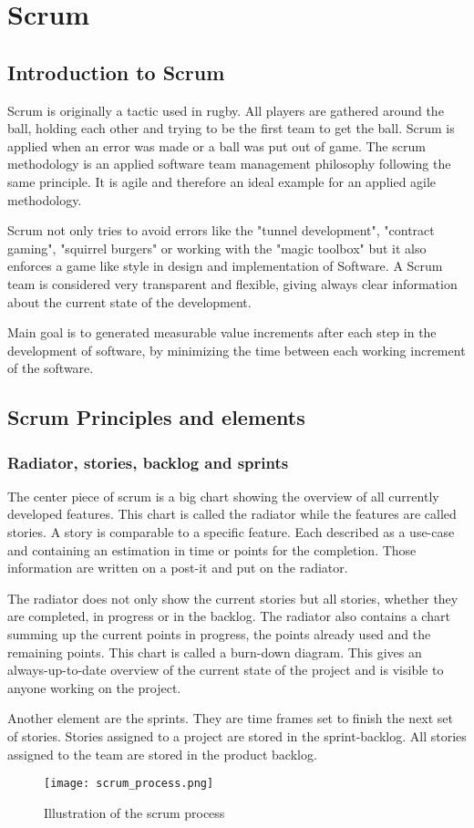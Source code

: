 \chapter{Scrum}
\section{Introduction to Scrum}

\par{
Scrum is originally a tactic used in rugby. All players are gathered around the ball, holding each other and trying to be the first team to get the ball. Scrum is applied when an error was made or a ball was put out of game. The scrum methodology is an applied software team management philosophy following the same principle. It is agile and therefore an ideal example for an applied agile methodology. 
\par{
Scrum not only tries to avoid errors like the "tunnel development", "contract gaming", "squirrel burgers" or working with the "magic toolbox" but it also enforces a game like style in design and implementation of Software. A Scrum team is considered very transparent and flexible, giving always clear information about the current state of the development. 
}
\par{
Main goal is to generated measurable value increments after each step in the development of software, by minimizing the time between each working increment of the software.
}
\section{Scrum Principles and elements}
\subsection{Radiator, stories, backlog and sprints}
\par{
The center piece of scrum is a big chart showing the overview of all currently developed features. This chart is called the radiator while the features are called stories. A story is comparable to a specific feature. Each described as a use-case and containing an estimation in time or points for the completion. Those information are written on a post-it and put on the radiator. 
}
\par{
The radiator does not only show the current stories but all stories, whether they are completed, in progress or in the backlog. The radiator also contains a chart summing up the current points in progress, the points already used and the remaining points. This chart is called a burn-down diagram. This gives an always-up-to-date overview of the current state of the project and is visible to anyone working on the project. 
}
\par{
Another element are the sprints. They are time frames set to finish the next set of stories. Stories assigned to a project are stored in the sprint-backlog. All stories assigned to the team are stored in the product backlog. 
}
\begin{figure}[h!]
\texttt{[image: scrum\_process.png]}
\caption{\label{scrumproc}Illustration of the scrum process}
\end{figure}

}
